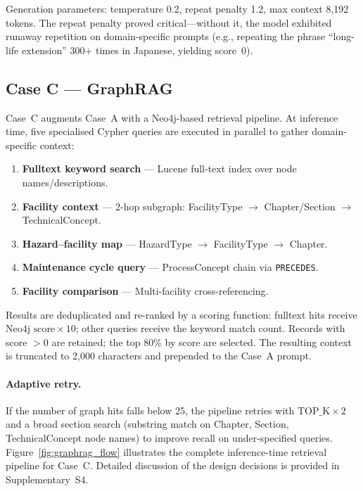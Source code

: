 \documentclass[twocolumn]{article}
\begin{document}
Generation parameters: temperature 0.2, repeat penalty 1.2, max context 8,192 tokens.
The repeat penalty proved critical---without it, the model exhibited runaway repetition
on domain-specific prompts (e.g., repeating the phrase ``long-life extension'' 300$+$ times in Japanese, yielding score~0).

\subsection{Case C --- GraphRAG}
\label{sec:case_c}

Case~C augments Case~A with a Neo4j-based retrieval pipeline.
At inference time, five specialised Cypher queries are executed in parallel
to gather domain-specific context:

\begin{enumerate}
  \item \textbf{Fulltext keyword search} --- Lucene full-text index over node names/descriptions.
  \item \textbf{Facility context} --- 2-hop subgraph: FacilityType $\to$ Chapter/Section $\to$ TechnicalConcept.
  \item \textbf{Hazard--facility map} --- HazardType $\to$ FacilityType $\to$ Chapter.
  \item \textbf{Maintenance cycle query} --- ProcessConcept chain via \texttt{PRECEDES}.
  \item \textbf{Facility comparison} --- Multi-facility cross-referencing.
\end{enumerate}

Results are deduplicated and re-ranked by a scoring function:
fulltext hits receive $\text{Neo4j score} \times 10$;
other queries receive the keyword match count.
Records with score $> 0$ are retained; the top 80\% by score are selected.
The resulting context is truncated to 2,000 characters and prepended to the Case~A prompt.

\paragraph{Adaptive retry.}
If the number of graph hits falls below 25,
the pipeline retries with $\text{TOP\_K} \times 2$ and a broad section search
(substring match on Chapter, Section, TechnicalConcept node names)
to improve recall on under-specified queries.
Figure~\ref{fig:graphrag_flow} illustrates the complete inference-time retrieval pipeline for Case~C.
Detailed discussion of the design decisions is provided in Supplementary~S4.
\end{document}
